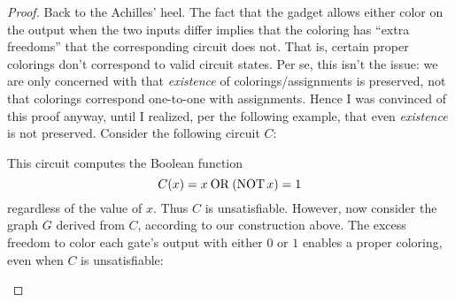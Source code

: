 \begin{aside}
\begin{proof}
  Back to the Achilles' heel.  The fact that the \OR{} gadget allows either
  color on the output when the two inputs differ implies that the coloring has
  ``extra freedoms'' that the corresponding circuit does not.  That is, certain
  proper colorings don't correspond to valid circuit states.  Per se, this
  isn't the issue: we are only concerned with that \emph{existence} of
  colorings/assignments is preserved, not that colorings correspond one-to-one
  with assignments.  Hence I was convinced of this proof anyway, until I
  realized, per the following example, that even \emph{existence} is not
  preserved.  Consider the following circuit \(C\):
  \begin{center}
  \end{center}
  This circuit computes the Boolean function
  \[
    C(x) = x \mathbin{\mathrm{OR}} (\operatorname{NOT} x) = 1
  \]
  regardless of the value of \(x\).  Thus \(C\) is unsatisfiable.  However, now
  consider the graph \(G\) derived from \(C\), according to our construction
  above.  The excess freedom to color each \OR{} gate's output with either
  \(0\) or \(1\) enables a proper coloring, even when \(C\) is unsatisfiable:
  \begin{center}
\end{center}
\end{proof}
\end{aside}
